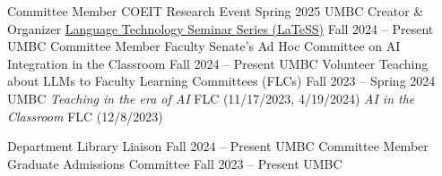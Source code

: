 {\color{black}\fontsize{12pt}{1em}} 

\begin{cventries}
\cventry
    {Committee Member}
    {COEIT Research Event}
    {Spring 2025}
    {UMBC}
    {}
\cventry
    {Creator \& Organizer}
    {\href{https://laramartin.net/LaTeSS.html}{Language Technology Seminar Series (LaTeSS)}}
    {Fall 2024 -- Present}
    {UMBC}
    {}
\cventry
    {Committee Member}
    {Faculty Senate's Ad Hoc Committee on AI Integration in the Classroom}
    {Fall 2024 -- Present}
    {UMBC}
    {}  
\cventry
    {Volunteer}
    {Teaching about LLMs to Faculty Learning Committees (FLCs)}
    {Fall 2023 -- Spring 2024}
    {UMBC}
    {\textit{Teaching in the era of AI} FLC (11/17/2023, 4/19/2024)\newline
    \textit{AI in the Classroom} FLC (12/8/2023)}   
\end{cventries}

\newpage
{\color{black}\fontsize{12pt}{1em}} 

\begin{cventries}
\cventry
    {}
    {Department Library Liaison}
    {Fall 2024 -- Present}
    {UMBC}
    {}  
\cventry
    {Committee Member}
    {Graduate Admissions Committee}
    {Fall 2023 -- Present}
    {UMBC}
    {}    
\end{cventries}